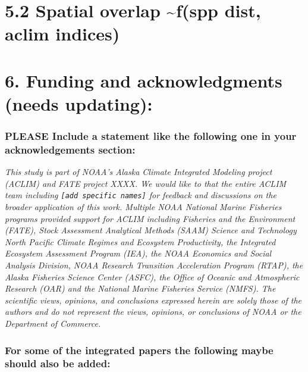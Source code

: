 \documentclass[
]{article}
\begin{document}
\hypertarget{spatial-overlap-fspp-dist-aclim-indices}{%
\section{5.2 Spatial overlap \textasciitilde f(spp dist, aclim
indices)}\label{spatial-overlap-fspp-dist-aclim-indices}}

\hypertarget{funding-and-acknowledgments-needs-updating}{%
\section{6. Funding and acknowledgments (needs
updating):}\label{funding-and-acknowledgments-needs-updating}}

\hypertarget{please-include-a-statement-like-the-following-one-in-your-acknowledgements-section}{%
\subsubsection{PLEASE Include a statement like the following one in your
acknowledgements
section:}\label{please-include-a-statement-like-the-following-one-in-your-acknowledgements-section}}

\emph{This study is part of NOAA's Alaska Climate Integrated Modeling
project (ACLIM) and FATE project XXXX. We would like to that the entire
ACLIM team including \texttt{{[}add\ specific\ names{]}} for feedback
and discussions on the broader application of this work. Multiple NOAA
National Marine Fisheries programs provided support for ACLIM including
Fisheries and the Environment (FATE), Stock Assessment Analytical
Methods (SAAM) Science and Technology North Pacific Climate Regimes and
Ecosystem Productivity, the Integrated Ecosystem Assessment Program
(IEA), the NOAA Economics and Social Analysis Division, NOAA Research
Transition Acceleration Program (RTAP), the Alaska Fisheries Science
Center (ASFC), the Office of Oceanic and Atmospheric Research (OAR) and
the National Marine Fisheries Service (NMFS). The scientific views,
opinions, and conclusions expressed herein are solely those of the
authors and do not represent the views, opinions, or conclusions of NOAA
or the Department of Commerce.}

\hypertarget{for-some-of-the-integrated-papers-the-following-maybe-should-also-be-added}{%
\subsubsection{For some of the integrated papers the following maybe
should also be
added:}\label{for-some-of-the-integrated-papers-the-following-maybe-should-also-be-added}}
\end{document}
